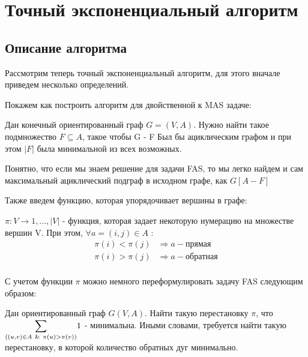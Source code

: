 
\section{Точный экспоненциальный алгоритм}

\subsection{Описание алгоритма}

Рассмотрим теперь точный экспоненциальный алгоритм, для этого вначале приведем 
несколько определений.

Покажем как построить алгоритм для двойственной к MAS задаче:

\begin{problem}[FAS]
    Дан конечный ориентированный граф $G=(V, A)$. Нужно найти такое 
    подмножество $F\subseteq A$, такое чтобы G - F Был бы ациклическим графом и
    при этом $|F|$ была минимальной из всех возможных.
\end{problem}

Понятно, что если мы знаем решение для задачи FAS, то мы легко найдем и сам
максимальный ациклический подграф в исходном графе, как $G\left[A - F\right]$

Также введем функцию, которая упорядочивает вершины в графе:

\begin{definition}
    $\pi : V \rightarrow {1, ..., |V|}$ - функция, которая задает некоторую нумерацию на 
    множестве вершин V. При этом, $\forall a = (i, j) \in A$ :
    \begin{align*}
        \pi(i) < \pi(j) &\Rightarrow a - прямая\\ 
        \pi(i) > \pi(j) &\Rightarrow a - обратная\\ 
    \end{align*}
\end{definition}

С учетом функции $\pi$ можно немного переформулировать задачу FAS следующим 
образом:

\begin{problem}[FAS]
    Дан ориентированный граф $G(V, A)$. Найти такую перестановку $\pi$, что \\
    $ 
        \mathlarger{\sum}\limits_{((u, v) \in A ~\&~ \pi(u) > \pi(v)) }1
    $
     - минимальна. Иными словами, требуется найти такую перестановку, в которой
     количество обратных дуг минимально.
\end{problem}

